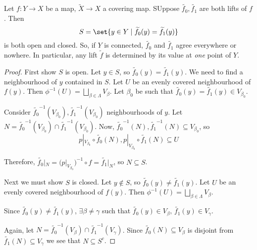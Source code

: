 \documentclass{article}
\numberwithin{nthm}{subsection}
\begin{document}
\begin{lemma}
    Let $f: Y \to X$ be a map, $\widetilde{X} \to X$ a covering map. SUppose $\widetilde{f_0}, \widetilde{f_1}$ are both lifts of $f$. Then
    \begin{equation*}
        S = \set{y \in Y \mid \widetilde{f_0}(y) = \widetilde{f_1}(y)}
    \end{equation*}
    is both open and closed. So, if $Y$ is connected, $\widetilde{f_0}$ and $\widetilde{f_1}$ agree everywhere or nowhere. In particular, any lift $\widetilde{f}$ is determined by its value at \emph{one} point of $Y$.
\end{lemma}

\begin{proof}
    First show $S$ is open. Let $y \in S$, so $\widetilde{f_0}(y) = \widetilde{f_1}(y)$.
    We need to find a neighbourhood of $y$ contained in $S$.
    Let $U$ be an evenly covered neighbourhood of $f(y)$.
    Then $\phi^{-1}(U) = \bigsqcup_{\beta \in \Lambda} V_\beta$.
    Let $\beta_0$ be such that $\widetilde{f_0}(y) = \widetilde{f_1}(y) \in V_{\beta_0}$.

    Consider $\widetilde{f_0}^{-1}(V_{\beta_0}), \widetilde{f_1}^{-1}(V_{\beta_0})$ neighbourhoods of $y$.
    Let $N = \widetilde{f_0}^{-1}(V_{\beta_0}) \cap \widetilde{f_1}^{-1}(V_{\beta_0})$.
    Now, $\widetilde{f_0}^{-1}(N), \widetilde{f_1}^{-1}(N) \subseteq V_{\beta_0}$, so
    \begin{equation*}
        p |_{V_{\beta_0}} \circ \widetilde{f_0}(N), p |_{V_{\beta_0}} \circ \widetilde{f_1}(N) \subseteq U
    \end{equation*}

    Therefore, $\widetilde{f_0}|_N = (p |_{V_{\beta_0}})^{-1} \circ f = \widetilde{f_1}|_N$, so $N \subseteq S$.


    Next we must show $S$ is closed.  Let $y \notin S$, so $\widetilde{f_0}(y) \neq \widetilde{f_1}(y)$.
    Let $U$ be an evenly covered neighbourhood of $f(y)$.
    Then $\phi^{-1}(U) = \bigsqcup_{\beta \in \Lambda} V_\beta$.

    Since $\widetilde{f_0}(y) \neq \widetilde{f_1}(y)$, $\exists \beta \neq \gamma$ such that $\widetilde{f_0}(y) \in V_{\beta}, \, \widetilde{f_1}(y) \in V_{\gamma}$.

    Again, let $N = \widetilde{f_0}^{-1}(V_{\beta}) \cap \widetilde{f_1}^{-1}(V_{\gamma})$.
    Since $\widetilde{f_0}(N) \subseteq V_\beta$ is disjoint from $\widetilde{f_1}(N) \subseteq V_\gamma$ we see that $N \subseteq S^c$.
\end{proof}
\end{document}
